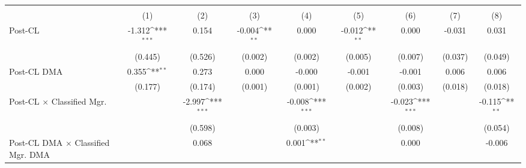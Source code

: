 {
\def\sym#1{\ifmmode^{#1}\else\(^{#1}\)\fi}
\begin{tabular}{l*{8}{c}}
\toprule
                    &&&&\\\cmidrule(lr){2-3}\cmidrule(lr){4-5}\cmidrule(lr){6-7}\cmidrule(lr){8-9}
                    &         &         &         &         &         &         &         &         \\
\midrule
Post-CL             &      -1.312\sym{***}&       0.154         &      -0.004\sym{**} &       0.000         &      -0.012\sym{**} &       0.000         &      -0.031         &       0.031         \\
                    &     (0.445)         &     (0.526)         &     (0.002)         &     (0.002)         &     (0.005)         &     (0.007)         &     (0.037)         &     (0.049)         \\
\addlinespace
Post-CL DMA         &       0.355\sym{**} &       0.273         &       0.000         &      -0.000         &      -0.001         &      -0.001         &       0.006         &       0.006         \\
                    &     (0.177)         &     (0.174)         &     (0.001)         &     (0.001)         &     (0.002)         &     (0.003)         &     (0.018)         &     (0.018)         \\
\addlinespace
Post-CL $\times$ Classified Mgr.&                     &      -2.997\sym{***}&                     &      -0.008\sym{***}&                     &      -0.023\sym{***}&                     &      -0.115\sym{**} \\
                    &                     &     (0.598)         &                     &     (0.003)         &                     &     (0.008)         &                     &     (0.054)         \\
\addlinespace
Post-CL DMA $\times$ Classified Mgr. DMA&                     &       0.068         &                     &       0.001\sym{**} &                     &       0.000         &                     &      -0.006         \\

\end{tabular}}
